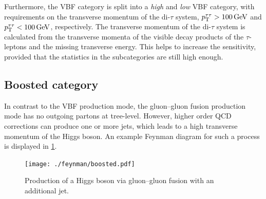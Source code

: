 Furthermore, the VBF category is split into a \emph{high} and \emph{low} VBF category,
with requirements on the transverse momentum of the di-$\tau$ system, $\pt^{\tau\tau} > \SI{100}{\GeV}$ and $\pt^{\tau\tau} < \SI{100}{\GeV}$, respectively.
The transverse momentum of the di-$\tau$ system is calculated from the transverse momenta of the visible decay products of the
$\tau$-leptons and the missing transverse energy.
This helps to increase the sensitivity, provided that the statistics in the subcategories are still high enough.



\subsection{Boosted category}\label{sub:event_selection:boosted}

In contrast to the VBF production mode, the gluon--gluon fusion production mode has no outgoing partons at tree-level.
However, higher order QCD corrections can produce one or more jets, which leads to a high transverse momentum of the Higgs boson.
An example Feynman diagram for such a process is displayed in \cref{fig:event_selection:boostedjet}.

\begin{figure}[htb]
    \centering
    \texttt{[image: ./feynman/boosted.pdf]}
    \caption{Production of a Higgs boson via gluon--gluon fusion with an additional jet.}\label{fig:event_selection:boostedjet}
\end{figure}


